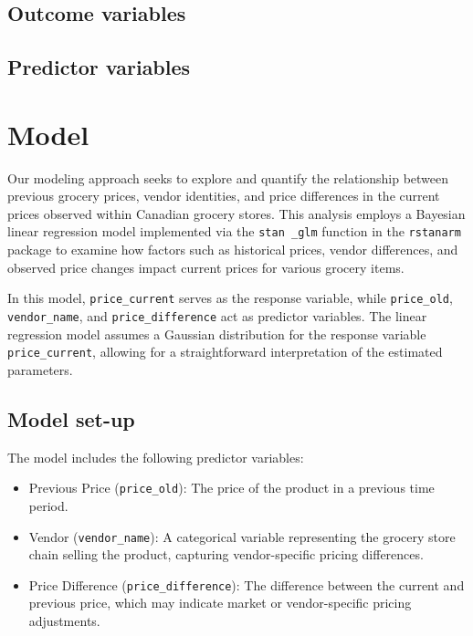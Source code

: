 \documentclass[
  letterpaper,
  DIV=11,
  numbers=noendperiod]{scrartcl}
\begin{document}
\subsection{Outcome variables}\label{outcome-variables}

\subsection{Predictor variables}\label{predictor-variables}

\section{Model}\label{model}

Our modeling approach seeks to explore and quantify the relationship
between previous grocery prices, vendor identities, and price
differences in the current prices observed within Canadian grocery
stores. This analysis employs a Bayesian linear regression model
implemented via the \texttt{stan\ \_glm} function in the
\texttt{rstanarm} package to examine how factors such as historical
prices, vendor differences, and observed price changes impact current
prices for various grocery items.

In this model, \texttt{price\_current} serves as the response variable,
while \texttt{price\_old}, \texttt{vendor\_name}, and
\texttt{price\_difference} act as predictor variables. The linear
regression model assumes a Gaussian distribution for the response
variable \texttt{price\_current}, allowing for a straightforward
interpretation of the estimated parameters.

\subsection{Model set-up}\label{model-set-up}

The model includes the following predictor variables:

\begin{itemize}
\item
  Previous Price (\texttt{price\_old}): The price of the product in a
  previous time period.
\item
  Vendor (\texttt{vendor\_name}): A categorical variable representing
  the grocery store chain selling the product, capturing vendor-specific
  pricing differences.
\item
  Price Difference (\texttt{price\_difference}): The difference between
  the current and previous price, which may indicate market or
  vendor-specific pricing adjustments.
\end{itemize}
\end{document}
